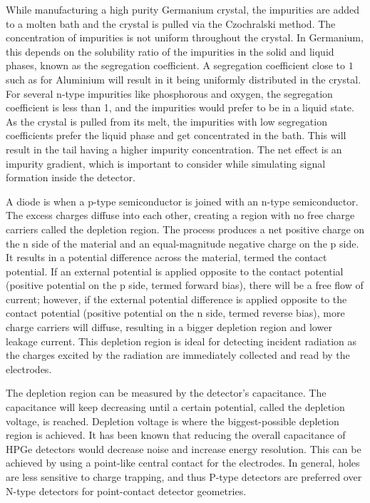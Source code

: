 While manufacturing a high purity Germanium crystal, the impurities are added to a molten bath and the crystal is pulled via the Czochralski method. The concentration of impurities is not uniform throughout the crystal. In Germanium, this depends on the solubility ratio of the impurities in the solid and liquid phases, known as the segregation coefficient. A segregation coefficient close to $1$ such as for Aluminium will result in it being uniformly distributed in the crystal. For several n-type impurities like phosphorous and oxygen, the segregation coefficient is less than 1, and the impurities would prefer to be in a liquid state. As the crystal is pulled from its melt, the impurities with low segregation coefficients prefer the liquid phase and get concentrated in the bath. This will result in the tail having a higher impurity concentration. The net effect is an impurity gradient, which is important to consider while simulating signal formation inside the detector.

A diode is when a p-type semiconductor is joined with an n-type semiconductor. The excess charges diffuse into each other, creating a region with no free charge carriers called the depletion region. The process produces a net positive charge on the n side of the material and an equal-magnitude negative charge on the p side. It results in a potential difference across the material, termed the contact potential. If an external potential is applied opposite to the contact potential (positive potential on the p side, termed forward bias), there will be a free flow of current; however, if the external potential difference is applied opposite to the contact potential (positive potential on the n side, termed reverse bias), more charge carriers will diffuse, resulting in a bigger depletion region and lower leakage current. This depletion region is ideal for detecting incident radiation as the charges excited by the radiation are immediately collected and read by the electrodes.

The depletion region can be measured by the detector's capacitance. The capacitance will keep decreasing until a certain potential, called the depletion voltage, is reached. Depletion voltage is where the biggest-possible depletion region is achieved. It has been known that reducing the overall capacitance of HPGe detectors would decrease noise and increase energy resolution. This can be achieved by using a point-like central contact for the electrodes. In general, holes are less sensitive to charge trapping, and thus P-type detectors are preferred over N-type detectors for point-contact detector geometries.

